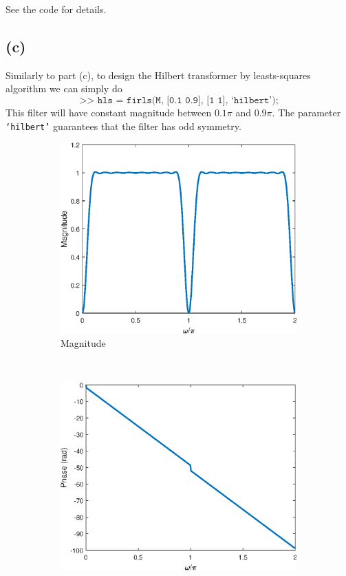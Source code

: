 \documentclass{article}
\begin{document}
\FloatBarrier

See the code for details.

\subsection{(c)}

Similarly to part (c), to design the Hilbert transformer by leasts-squares algorithm we can simply do
\begin{equation*}
\texttt{>> hls = firls(M, [0.1 0.9], [1 1], `hilbert');}
\end{equation*}
This filter will have constant magnitude between $0.1\pi$ and $0.9\pi$. The parameter \texttt{`hilbert'} guarantees that the filter has odd symmetry.

\FloatBarrier
\begin{figure}[h!]
	\centering
	\begin{subfigure}[h!]{0.5\textwidth}
		\includegraphics[width=\textwidth]{figs/hilbert_ls_mag.eps}
		\caption{Magnitude} 
	\end{subfigure}%
	~ 
	\begin{subfigure}[h!]{0.5\textwidth}
		\includegraphics[width=\textwidth]{figs/hilbert_ls_phase.eps}

\end{subfigure}
\end{figure}
\end{document}
